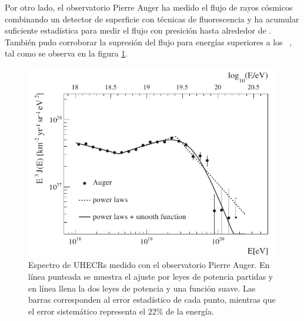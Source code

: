Por otro lado, el observatorio Pierre Auger ha medido el flujo de rayos c\'osmicos combinando un detector de superficie con t\'ecnicas de fluorescencia y ha acumular suficiente estad\'istica para medir el flujo con presici\'on hasta alrededor de . 
Tambi\'en pudo corroborar la supresi\'on del flujo para energ\'ias superiores a los ~\cite{cite:AugerSpectrum}, tal como se observa en la figura \ref{fig:specGZK}.
%
\begin{figure}[ht]
	\begin{center}
	\includegraphics[width=\textwidth]{fig/introduccion/spectrum_withGZK}
	\caption{\label{fig:specGZK} Espectro de UHECRs medido con el observatorio Pierre Auger. En l\'inea punteada se muestra el ajuste por leyes de potencia partidas y en l\'inea llena la dos leyes de potencia y una funci\'on suave. Las barras corresponden al error estad\'istico de cada punto, mientras que el error sistem\'atico representa el $22\%$ de la energ\'ia.}
	\end{center}
\end{figure}

